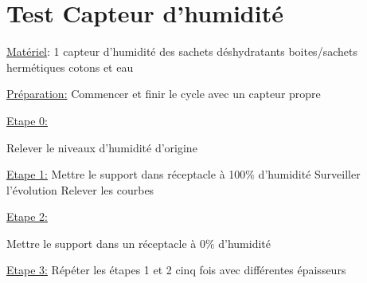 \newpage

\section{Test Capteur d'humidité} 

\noindent \underline{Matériel}: 
1 capteur d'humidité des sachets déshydratants boites/sachets hermétiques cotons et eau \newline 

\noindent \underline{Préparation:} \newline  
Commencer et finir le cycle avec un capteur propre\newline  

\noindent \underline{Etape 0:}  

\noindent Relever le niveaux d'humidité d'origine  

\noindent \underline{Etape 1:} \newline  
Mettre le support dans réceptacle à 100\% d'humidité\newline  
Surveiller l'évolution\newline  
Relever les courbes

\noindent \underline{Etape 2:} 

\noindent Mettre le support dans un réceptacle à 0\% d'humidité 

\noindent \underline{Etape 3:}  \newline
Répéter les  étapes 1 et 2 cinq fois avec différentes épaisseurs

